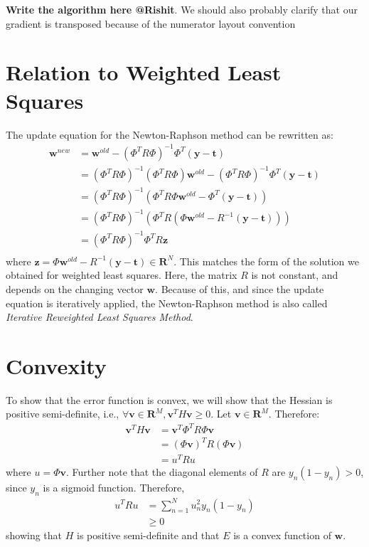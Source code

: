 \documentclass[a4paper, 11pt]{article}
\begin{document}
\textbf{Write the algorithm here @Rishit}. We should also probably clarify that our gradient is transposed because of the numerator layout convention

\section{Relation to Weighted Least Squares}
The update equation for the Newton-Raphson method can be rewritten as:
\begin{align}
    \textbf{w}^{new} &= \textbf{w}^{old} - (\Phi^T R \Phi)^{-1} \Phi^T  (\textbf{y} - \textbf{t})  \\
    &= (\Phi^T R \Phi)^{-1} (\Phi^T R \Phi)\textbf{w}^{old}  - (\Phi^T R \Phi)^{-1} \Phi^T  (\textbf{y} - \textbf{t}) \\
    &= (\Phi^T R \Phi)^{-1} (\Phi^T R \Phi \textbf{w}^{old} - \Phi^T  (\textbf{y} - \textbf{t}) ) \\
    &= (\Phi^T R \Phi)^{-1} (\Phi^T R (\Phi \textbf{w}^{old} -  R^{-1}(\textbf{y} - \textbf{t}) )) \\
    &= (\Phi^T R \Phi)^{-1} \Phi^T R \textbf{z}\\
\end{align}
where $\textbf{z} = \Phi \textbf{w}^{old} -  R^{-1}(\textbf{y} - \textbf{t}) \in \mathbf{R}^N$. This matches the form of the solution we obtained for weighted least squares. Here, the matrix $R$ is not constant, and depends on 
the changing vector $\textbf{w}$. Because of this, and since the update equation is iteratively applied, the Newton-Raphson method is also called \textit{Iterative Reweighted Least Squares Method}.


\section{Convexity}
To show that the error function is convex, we will show that the Hessian is positive semi-definite, i.e., $\forall \textbf{v} \in \mathbf{R}^M, \textbf{v}^T H \textbf{v} \geq 0$.
Let $\textbf{v} \in \mathbf{R}^M$. Therefore:
\begin{align}
    \textbf{v}^T H \textbf{v} &= \textbf{v}^T \Phi^T R \Phi \textbf{v} \\
    &= (\Phi \textbf{v})^T R (\Phi \textbf{v}) \\
    &= u^T R u
\end{align}
where $u = \Phi \textbf{v}$. Further note that the diagonal elements of $R$ are $y_n(1-y_n) > 0$, since $y_n$ is a sigmoid function. Therefore, 
\begin{align}
    u^T R u &= \sum_{n=1}^N u_n^2 y_n(1-y_n) \\
    &\geq 0
\end{align}
showing that $H$ is positive semi-definite and that $E$ is a convex function of $\textbf{w}$.
\end{document}
